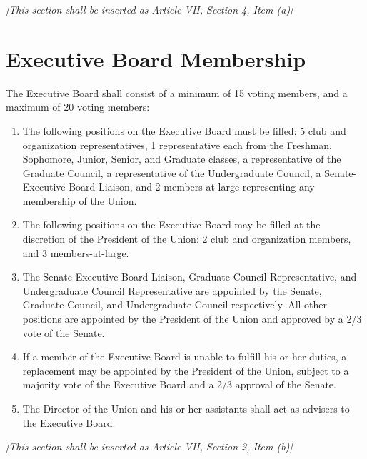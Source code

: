 \textit{[This section shall be inserted as Article VII, Section 4, Item (a)]}

\section{Executive Board Membership}

The Executive Board shall consist of a minimum of 15 voting members, and a maximum of 20 voting members:

\begin{enumerate}
    \item The following positions on the Executive Board must be filled: 5 club and organization representatives, 1 representative each from the Freshman, Sophomore, Junior, Senior, and Graduate classes, a representative of the Graduate Council, a representative of the Undergraduate Council, a Senate-Executive Board Liaison, and 2 members-at-large representing any membership of the Union.
    \item The following positions on the Executive Board may be filled at the discretion of the President of the Union: 2 club and organization members, and 3 members-at-large.
    \item The Senate-Executive Board Liaison, Graduate Council Representative, and Undergraduate Council Representative are appointed by the Senate, Graduate Council, and Undergraduate Council respectively. All other positions are appointed by the President of the Union and approved by a 2/3 vote of the Senate.
    \item If a member of the Executive Board is unable to fulfill his or her duties, a replacement may be appointed by the President of the Union, subject to a majority vote of the Executive Board and a 2/3 approval of the Senate.
    \item The Director of the Union and his or her assistants shall act as advisers to the Executive Board.
\end{enumerate}

\textit{[This section shall be inserted as Article VII, Section 2, Item (b)]}
